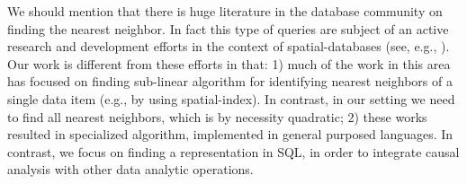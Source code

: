 {We should mention that there is huge literature in the database
community on finding the nearest neighbor. In fact this type of
queries are subject of an active research and development efforts in
the context of spatial-databases (see, e.g.,
\cite{obe2015postgis}). Our work is different from these efforts in that: 1) much of the work in this area has focused on finding sub-linear algorithm for identifying nearest neighbors of a single data item (e.g., by using spatial-index). In contrast, in our setting
we need to find all nearest neighbors, which is by necessity quadratic; 2) these works resulted in specialized algorithm,
implemented in general purposed languages. In contrast, we focus on finding a representation in SQL, in order to integrate causal
 analysis with other data analytic operations.  

}








